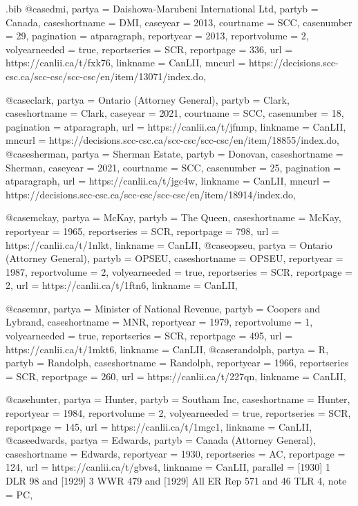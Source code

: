 \begin{filecontents*}[overwrite]{\jobname.bib}
@case{dmi,	partya =  {Daishowa‑Marubeni International Ltd},	partyb =  {Canada},	caseshortname =  {DMI},	caseyear =  {2013},	courtname =  {SCC},	casenumber =  {29},	pagination =  {atparagraph},	reportyear =  {2013},	reportvolume =  {2},	volyearneeded =  {true},	reportseries =  {SCR},	reportpage =  {336},	url =  {https://canlii.ca/t/fxk76},	linkname =  {CanLII},	mncurl =  {https://decisions.scc-csc.ca/scc-csc/scc-csc/en/item/13071/index.do},					}


@case{clark,	partya =  {Ontario (Attorney General)},	partyb =  {Clark},	caseshortname =  {Clark},	caseyear =  {2021},	courtname =  {SCC},	casenumber =  {18},	pagination =  {atparagraph},						url =  {https://canlii.ca/t/jfnmp},	linkname =  {CanLII},	mncurl =  {https://decisions.scc-csc.ca/scc-csc/scc-csc/en/item/18855/index.do},					}
@case{sherman,	partya =  {Sherman Estate},	partyb =  {Donovan},	caseshortname =  {Sherman},	caseyear =  {2021},	courtname =  {SCC},	casenumber =  {25},	pagination =  {atparagraph},						url =  {https://canlii.ca/t/jgc4w},	linkname =  {CanLII},	mncurl =  {https://decisions.scc-csc.ca/scc-csc/scc-csc/en/item/18914/index.do},					}


@case{mckay,	partya =  {McKay},	partyb =  {The Queen},	caseshortname =  {McKay},					reportyear =  {1965},			reportseries =  {SCR},	reportpage =  {798},	url =  {https://canlii.ca/t/1nlkt},	linkname =  {CanLII},						}
@case{opseu,	partya =  {Ontario (Attorney General)},	partyb =  {OPSEU},	caseshortname =  {OPSEU},					reportyear =  {1987},	reportvolume =  {2},	volyearneeded =  {true},	reportseries =  {SCR},	reportpage =  {2},	url =  {https://canlii.ca/t/1ftn6},	linkname =  {CanLII},						}


@case{mnr,	partya =  {Minister of National Revenue},	partyb =  {Coopers and Lybrand},	caseshortname =  {MNR},					reportyear =  {1979},	reportvolume =  {1},	volyearneeded =  {true},	reportseries =  {SCR},	reportpage =  {495},	url =  {https://canlii.ca/t/1mkt6},	linkname =  {CanLII},						}
@case{randolph,	partya =  {R},	partyb =  {Randolph},	caseshortname =  {Randolph},					reportyear =  {1966},			reportseries =  {SCR},	reportpage =  {260},	url =  {https://canlii.ca/t/227qn},	linkname =  {CanLII},						}


@case{hunter,	partya =  {Hunter},	partyb =  {Southam Inc},	caseshortname =  {Hunter},					reportyear =  {1984},	reportvolume =  {2},	volyearneeded =  {true},	reportseries =  {SCR},	reportpage =  {145},	url =  {https://canlii.ca/t/1mgc1},	linkname =  {CanLII},						}
@case{edwards,	partya =  {Edwards},	partyb =  {Canada (Attorney General)},	caseshortname =  {Edwards},					reportyear =  {1930},			reportseries =  {AC},	reportpage =  {124},	url =  {https://canlii.ca/t/gbvs4},	linkname =  {CanLII},		parallel =  { [1930] 1 DLR 98 and [1929] 3 WWR 479 and [1929] All ER Rep 571 and 46 TLR 4},		note =  {PC},		}


\end{filecontents*}
